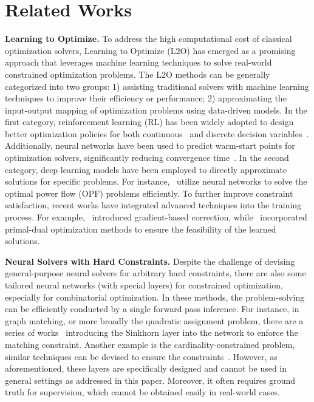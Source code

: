 \section{Related Works}
\textbf{Learning to Optimize.} 
To address the high computational cost of classical optimization solvers, Learning to Optimize (L2O) has emerged as a promising approach that leverages machine learning techniques to solve real-world constrained optimization problems. The L2O methods can be generally categorized into two groups: 1) assisting traditional solvers with machine learning techniques to improve their efficiency or performance; 2) approximating the input-output mapping of optimization problems using data-driven models. In the first category, reinforcement learning (RL) has been widely adopted to design better optimization policies for both continuous~\cite{li2016learning} and discrete decision variables~\cite{liu2022learning, tang2020reinforcement}. Additionally, neural networks have been used to predict warm-start points for optimization solvers, significantly reducing convergence time~\cite{baker2019learning, dong2020smart}. 
In the second category, deep learning models have been employed to directly approximate solutions for specific problems. For instance,~\cite{fioretto2020predicting, chatzos2020high} utilize neural networks to solve the optimal power flow (OPF) problems efficiently. To further improve constraint satisfaction, recent works have integrated advanced techniques into the training process. For example,~\cite{donti2021dc3} introduced gradient-based correction, while~\cite{park2023self} incorporated primal-dual optimization methods to ensure the feasibility of the learned solutions.
  
  \textbf{Neural Solvers with Hard Constraints.} Despite the challenge of devising general-purpose neural solvers for arbitrary hard constraints, there are also some tailored neural networks (with special layers) for constrained optimization, especially for combinatorial optimization. In these methods, the problem-solving can be efficiently conducted by a single forward pass inference. For instance, in graph matching, or more broadly the quadratic assignment problem, there are a series of works~\cite{wang2019learning, Fey2020Deep} introducing the Sinkhorn layer into the network to enforce the matching constraint. Another example is the cardinality-constrained problem, similar techniques can be devised to ensure the constraints~\cite{brukhim2018predict, wang2023cardinality, 10242155}. However, as aforementioned, these layers are specifically designed and cannot be used in general settings as addressed in this paper. Moreover, it often requires ground truth for supervision, which cannot be obtained easily in real-world cases. 

